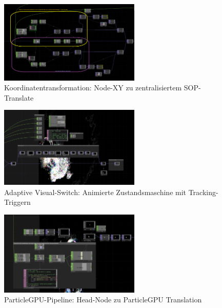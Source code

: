 \begin{figure}[!htbp]
    \centering
    \includegraphics[width=0.6\textwidth,height=0.25\textheight,keepaspectratio]{images/docupictures/NodeXYzuSOPZentriertemTranslate.png}
    \caption{Koordinatentransformation: Node-XY zu zentralisiertem SOP-Translate}
    \label{fig:coordinate_transformation}
\end{figure}

\begin{figure}[!htbp]
    \centering
    \includegraphics[width=0.6\textwidth,height=0.25\textheight,keepaspectratio]{images/docupictures/NoisyBlob_animatedSwitchzwischenBlitzUndNichtBlitzBeiTrackingTrigger.png}
    \caption{Adaptive Visual-Switch: Animierte Zustandsmaschine mit Tracking-Triggern}
    \label{fig:animated_switch}
\end{figure}

\begin{figure}[!htbp]
    \centering
    \includegraphics[width=0.6\textwidth,height=0.25\textheight,keepaspectratio]{images/docupictures/NoisyBlob_HEAD_to_ParticleGPU_Translate.png}
    \caption{ParticleGPU-Pipeline: Head-Node zu ParticleGPU Translation}
    \label{fig:particle_translation}
\end{figure}


